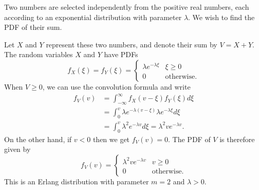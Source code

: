 \begin{example}
Two numbers are selected independently from the positive real numbers, each according to an exponential distribution with parameter $\lambda$. 
We wish to find the PDF of their sum.

Let $X$ and $Y$ represent these two numbers, and denote their sum by $V = X + Y$.
The random variables $X$ and $Y$ have PDFs
\begin{equation*}
f_X (\xi) = f_Y (\xi) = \begin{cases} \lambda e^{-\lambda \xi} & \xi \geq 0 \\
0 & \text{otherwise} . \end{cases}
\end{equation*}
When $V \geq 0$, we can use the convolution formula and write
\begin{equation*}
\begin{split}
f_V (v) &= \int_{-\infty}^{\infty} f_X(v - \xi) f_Y(\xi) d\xi \\
&= \int_0^v \lambda e^{-\lambda(v - \xi)} \lambda e^{-\lambda \xi} d\xi \\
&= \int_0^v \lambda^2 e^{-\lambda v} d\xi
= \lambda^2 v e^{-\lambda v}.
\end{split}
\end{equation*}
On the other hand, if $v < 0$ then we get $f_V(v) = 0$.
The PDF of $V$ is therefore given by
\begin{equation*}
f_V (v) = \begin{cases} \lambda^2 v e^{-\lambda v} & v \geq 0 \\
0 & \text{otherwise} . \end{cases}
\end{equation*}
This is an Erlang distribution with parameter $m = 2$ and $\lambda > 0$.
\end{example}

